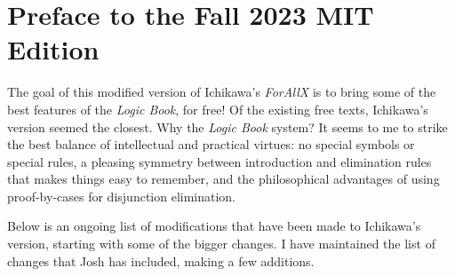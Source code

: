 
\chapter*{Preface to the Fall 2023 MIT Edition}
\label{ch.preface2}

The goal of this modified version of Ichikawa's \textit{ForAllX} is to bring some of the best features of the \textit{Logic Book}, for free!
Of the existing free texts, Ichikawa's version seemed the closest.
Why the \textit{Logic Book} system? 
It seems to me to strike the best balance of intellectual and practical virtues: no special symbols or special rules, a pleasing symmetry between introduction and elimination rules that makes things easy to remember, and the philosophical advantages of using proof-by-cases for disjunction elimination. 

Below is an ongoing list of modifications that have been made to Ichikawa's version, starting with some of the bigger changes.
I have maintained the list of changes that Josh has included, making a few additions.

